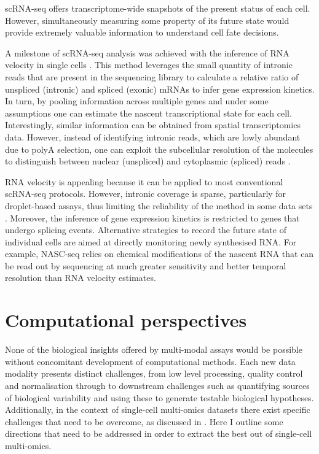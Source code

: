 scRNA-seq offers transcriptome-wide snapshots of the present status of each cell. However, simultaneously measuring some property of its future state would provide extremely valuable information to understand cell fate decisions. 

A milestone of scRNA-seq analysis was achieved with the inference of RNA velocity in single cells \cite{LaManno2018}. This method leverages the small quantity of intronic reads that are present in the sequencing library to calculate a relative ratio of unspliced (intronic) and spliced (exonic) mRNAs to infer gene expression kinetics. In turn, by pooling information across multiple genes and under some assumptions one can estimate the nascent transcriptional state for each cell. Interestingly, similar information can be obtained from spatial transcriptomics data. However, instead of identifying intronic reads, which are lowly abundant due to polyA selection, one can exploit the subcellular resolution of the molecules to distinguish between nuclear (unspliced) and cytoplasmic (spliced) reads \cite{Xia2019}.

RNA velocity is appealing because it can be applied to most conventional scRNA-seq protocols. However, intronic coverage is sparse, particularly for droplet-based assays, thus limiting the reliability of the method in some data sets \cite{Soneson2020}. Moreover, the inference of gene expression kinetics is restricted to genes that undergo splicing events. Alternative strategies to record the future state of individual cells are aimed at directly monitoring newly synthesised RNA. For example, NASC-seq \cite{Hendriks2019} relies on chemical modifications of the nascent RNA that can be read out by sequencing at much greater sensitivity and better temporal resolution than RNA velocity estimates.



\section{Computational perspectives} 

None of the biological insights offered by multi-modal assays would be possible without concomitant development of computational methods. Each new data modality presents distinct challenges, from low level processing, quality control and normalisation through to downstream challenges such as quantifying sources of biological variability and using these to generate testable biological hypotheses. Additionally, in the context of single-cell multi-omics datasets there exist specific challenges that need to be overcome, as discussed in . Here I outline some directions that need to be addressed in order to extract the best out of single-cell multi-omics.


